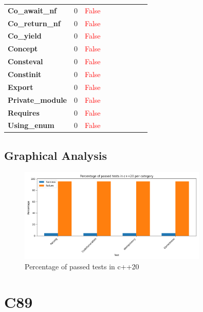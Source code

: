 \documentclass{article}
\begin{document}
\begin{xltabular}{\textwidth}{lcccccccc}
\textbf{{\fontsize{10}{12}\selectfont Co\_await\_nf}}& 0&\textcolor{red}{False} \\[0.5ex]
\textbf{{\fontsize{10}{12}\selectfont Co\_return\_nf}}& 0&\textcolor{red}{False} \\[0.5ex]
\textbf{{\fontsize{10}{12}\selectfont Co\_yield}}& 0&\textcolor{red}{False} \\[0.5ex]
\textbf{{\fontsize{10}{12}\selectfont Concept}}& 0&\textcolor{red}{False} \\[0.5ex]
\textbf{{\fontsize{10}{12}\selectfont Consteval}}& 0&\textcolor{red}{False} \\[0.5ex]
\textbf{{\fontsize{10}{12}\selectfont Constinit}}& 0&\textcolor{red}{False} \\[0.5ex]
\textbf{{\fontsize{10}{12}\selectfont Export}}& 0&\textcolor{red}{False} \\[0.5ex]
\textbf{{\fontsize{10}{12}\selectfont Private\_module}}& 0&\textcolor{red}{False} \\[0.5ex]
\textbf{{\fontsize{10}{12}\selectfont Requires}}& 0&\textcolor{red}{False} \\[0.5ex]
\textbf{{\fontsize{10}{12}\selectfont Using\_enum}}& 0&\textcolor{red}{False} \\[0.5ex]
\bottomrule
\end{xltabular}
\newpage
\subsection{Graphical Analysis}
\begin{figure}[h!]
\centering
\includegraphics[width=0.8\textwidth]{../reports/clava/images/c++20_percentage.png}
\caption{Percentage of passed tests in c++20}
\label{fig:c++20_percentage}
\end{figure}
\newpage
\section{C89}
\end{document}
